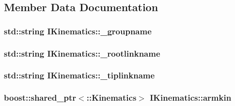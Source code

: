 \subsection{Member Data Documentation}
\hypertarget{classIKinematics_a77e5652ef78f21df82a7778e814ad234}{
\subsubsection[{\-\_\-groupname}]{\setlength{\rightskip}{0pt plus 5cm}std\-::string I\-Kinematics\-::\-\_\-groupname\hspace{0.3cm}{\ttfamily [protected]}}}\label{classIKinematics_a77e5652ef78f21df82a7778e814ad234}
\hypertarget{classIKinematics_a8e6174990e9a54967482dc0a99311976}{
\subsubsection[{\-\_\-rootlinkname}]{\setlength{\rightskip}{0pt plus 5cm}std\-::string I\-Kinematics\-::\-\_\-rootlinkname\hspace{0.3cm}{\ttfamily [protected]}}}\label{classIKinematics_a8e6174990e9a54967482dc0a99311976}
\hypertarget{classIKinematics_a88100365db2c65ae406c6727861261f3}{
\subsubsection[{\-\_\-tiplinkname}]{\setlength{\rightskip}{0pt plus 5cm}std\-::string I\-Kinematics\-::\-\_\-tiplinkname\hspace{0.3cm}{\ttfamily [protected]}}}\label{classIKinematics_a88100365db2c65ae406c6727861261f3}
\hypertarget{classIKinematics_a4d9c2ff5cd606746f9f762d2c8e2d7c2}{
\subsubsection[{armkin}]{\setlength{\rightskip}{0pt plus 5cm}boost\-::shared\-\_\-ptr$<$\-::{\bf Kinematics}$>$ I\-Kinematics\-::armkin}}\label{classIKinematics_a4d9c2ff5cd606746f9f762d2c8e2d7c2}
